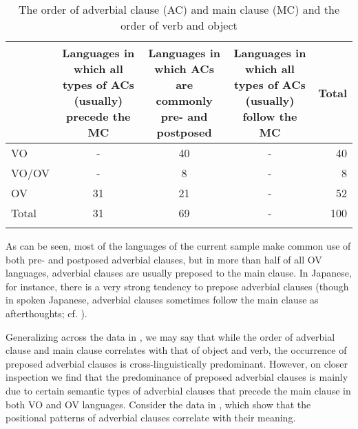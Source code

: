 \documentclass[output=paper]{langsci/langscibook}
\begin{document}
\begin{table}
\small
\begin{tabularx}{\textwidth}{lSSSr}
\lsptoprule
&   Languages in which all types of ACs (usually) precede the MC &   Languages in which ACs are commonly pre- and postposed &   Languages in which all types of ACs (usually) follow the MC &   Total\\
\midrule 
VO & - & 40 & - & 40\\
VO/OV & - & 8 & - & 8\\
OV & 31 & 21 & - & 52\\
\midrule
Total & 31 & 69 & - & 100\\
\lspbottomrule
\end{tabularx}

\caption{The order of adverbial clause (AC) and main clause (MC) and the order of verb and object}
\label{tab:diessel:1}
\end{table}

As can be seen, most of the languages of the current sample make common use of both pre- and postposed adverbial clauses, but in more than half of all OV languages, adverbial clauses are usually preposed to the main clause. In Japanese, for instance, there is a very strong tendency to prepose adverbial clauses (though in spoken Japanese, adverbial clauses sometimes follow the main clause as afterthoughts; cf. \citealt{FordMori1994}).

Generalizing across the data in , we may say that while the order of adverbial clause and main clause correlates with that of object and verb, the occurrence of preposed adverbial clauses is cross-linguistically predominant. However, on closer inspection we find that the predominance of preposed adverbial clauses is mainly due to certain semantic types of adverbial clauses that precede the main clause in both VO and OV languages. Consider the data in , which show that the positional patterns of adverbial clauses correlate with their meaning.  
\end{document}

